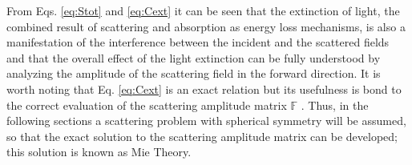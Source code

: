 %
%
\noindent From Eqs. \eqref{eq:Stot} and  \eqref{eq:Cext} it can be seen that the extinction of light, the combined result of scattering and absorption as energy loss mechanisms, is also a manifestation of the interference between the incident and the scattered fields and that the overall effect of the light extinction can be fully understood by analyzing the  amplitude of the scattering field in the forward direction.  It is worth noting that Eq. \eqref{eq:Cext} is an exact relation but its usefulness is bond to the correct evaluation of the scattering amplitude matrix $\mathbb{F}$ \cite{tsang_scattering_2000}. Thus, in the following sections a scattering problem with spherical symmetry will be assumed, so that the exact solution to the scattering amplitude matrix can be developed; this solution is known as Mie Theory.



%
%
